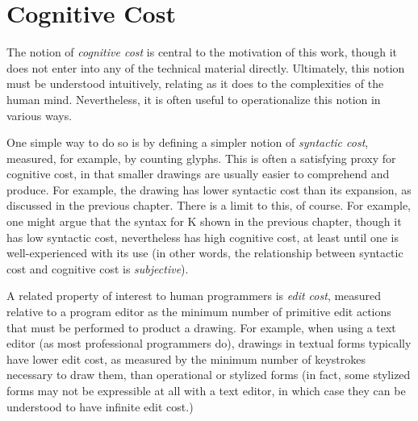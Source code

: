 
\section{Cognitive Cost}\label{sec:syntactic-properties}
The notion of \emph{cognitive cost} is central to the motivation of this work, though it does not enter into any of the technical material directly. Ultimately, this notion must be understood intuitively, relating as it does to the complexities of the human mind. Nevertheless, it is often useful to operationalize this notion in various ways. 

One simple way to do so is by defining a simpler notion of \emph{syntactic cost}, measured, for example, by counting glyphs. This is often a satisfying proxy for cognitive cost, in that smaller drawings are usually easier to comprehend and produce. For example, the drawing \li{[1, 2, 3, 4, 5]} has lower syntactic cost than its expansion, as discussed in the previous chapter. There is a limit to this, of course. For example, one might argue that the syntax for K shown in the previous chapter, though it has low syntactic cost, nevertheless has high cognitive cost, at least until one is well-experienced with its use (in other words, the relationship between syntactic cost and cognitive cost is \emph{subjective}).

A related property of interest to human programmers is \emph{edit cost}, measured relative to a program editor as the minimum number of primitive edit actions that must be performed to product a drawing. For example, when using a text editor (as most professional programmers do), drawings in textual forms typically have lower edit cost, as measured by the minimum number of keystrokes necessary to draw them, than operational or stylized forms (in fact, some stylized forms may not be expressible at all with a text editor, in which case they can be understood to have infinite edit cost.) %

